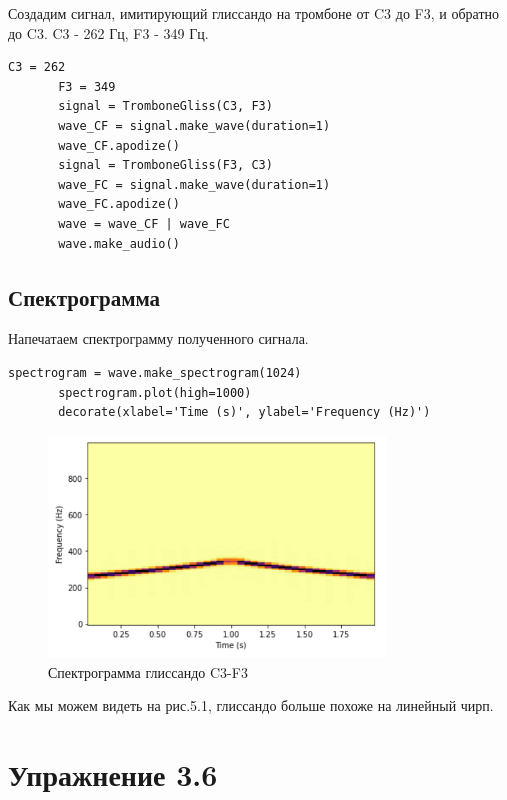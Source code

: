 \documentclass[a4paper,12pt]{report}
\begin{document}
    Создадим сигнал, имитирующий глиссандо на тромбоне от C3 до F3, и обратно до C3. C3 - 262 Гц, F3 - 349 Гц.
\begin{lstlisting}[caption=Создание сигнала]
       C3 = 262
       F3 = 349
       signal = TromboneGliss(C3, F3)
       wave_CF = signal.make_wave(duration=1)
       wave_CF.apodize()
       signal = TromboneGliss(F3, C3)
       wave_FC = signal.make_wave(duration=1)
       wave_FC.apodize()
       wave = wave_CF | wave_FC
       wave.make_audio()
\end{lstlisting}    
\section{Спектрограмма}
       Напечатаем спектрограмму полученного сигнала.
\begin{lstlisting}[caption=Получение спектрограммы]
       spectrogram = wave.make_spectrogram(1024)
       spectrogram.plot(high=1000)
       decorate(xlabel='Time (s)', ylabel='Frequency (Hz)')
\end{lstlisting}
\begin{figure}[H]
        \centering
        \includegraphics[width=0.8\textwidth]{fig5-1.PNG}
        \caption{Спектрограмма глиссандо C3-F3}
        \label{fig:fig5-1}
\end{figure}
    
    Как мы можем видеть на рис.5.1, глиссандо больше похоже на линейный чирп.

\chapter{Упражнение 3.6}
\end{document}
